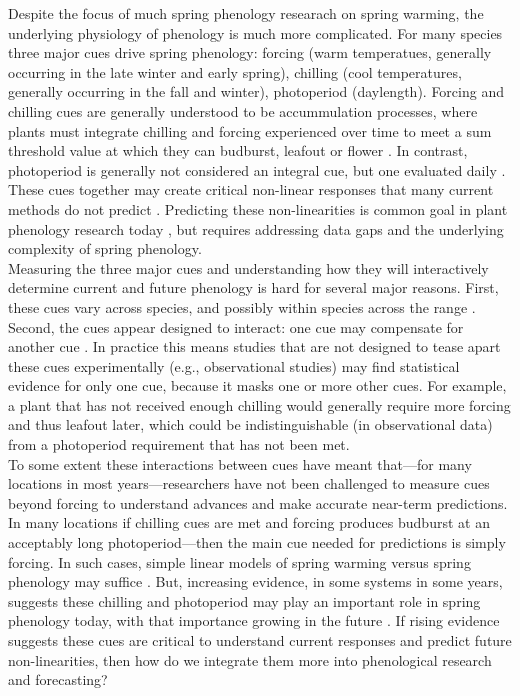 \documentclass[11pt,letter]{article}
\begin{document}
Despite the focus of much spring phenology researach on spring warming, the underlying physiology of phenology is much more complicated. For many species three major cues drive spring phenology: forcing (warm temperatues, generally occurring in the late winter and early spring), chilling (cool temperatures, generally occurring in the fall and winter), photoperiod (daylength). Forcing and chilling cues are generally understood to be accummulation processes, where plants must integrate chilling and forcing experienced over time to meet a sum threshold value at which they can budburst, leafout or flower \citep{Chuine2000}. In contrast, photoperiod is generally not considered an integral cue, but one evaluated daily \citep{Singh:2017}. These cues together may create critical non-linear responses that many current methods do not predict \citep[e.g.,]{Ellwood2012}. Predicting these non-linearities is common goal in plant phenology research today \citep{gusewell2017, martlusch2017,gauzere2019,chen2019,keenan2019}, but requires addressing data gaps and the underlying complexity of spring phenology. \\

Measuring the three major cues and understanding how they will interactively determine current and future phenology is hard for several major reasons. First, these cues vary across species, and possibly within species across the range  \citep{vitasse2009,harrington2015}. Second, the cues appear designed to interact: one cue may compensate for another cue \citep{Chuine2000}. In practice this means studies that are not designed to tease apart these cues experimentally (e.g., observational studies) may find statistical evidence for only one cue, because it masks one or more other cues. For example, a plant that has not received enough chilling would generally require more forcing and thus leafout later, which could be indistinguishable (in observational data) from a photoperiod requirement that has not been met. \\

To some extent these interactions between cues have meant that---for many locations in most years---researchers have not been challenged to measure cues beyond forcing to understand advances and make accurate near-term predictions. In many locations if chilling cues are met and forcing produces budburst at an acceptably long photoperiod---then the main cue needed for predictions is simply forcing. In such cases, simple linear models of spring warming versus spring phenology may suffice \citep[e.g.,]{Ellwood2012}. But, increasing evidence, in some systems in some years, suggests these chilling and photoperiod may play an important role in spring phenology today, with that importance growing in the future \citep{chuine2016,gauzere2019}. If rising evidence suggests these cues are critical to understand current responses and predict future non-linearities, then how do we integrate them more into phenological research and forecasting? \\%
\end{document}
